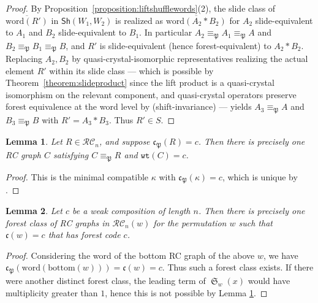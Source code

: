 \documentclass[a4paper,fleqn]{cas-sc}
\newtheorem{lemma}{Lemma}[subsection]
\theoremstyle{definition}
\theoremstyle{remark}
\numberwithin{equation}{subsection}
\DeclareMathOperator{\sch}{\mathfrak{S}}
\newcommand{\wtt}{\mathtt{wt}}
\newcommand{\RC}{\mathcal{RC}}
\newcommand{\code}{\mathfrak{c}}
\newcommand{\forest}{\mathfrak{P}}
\begin{document}
\begin{proof}
By Proposition~\ref{proposition:liftshufflewords}(2), the slide class of $\overline{\mathrm{word}(R')}$ in $\mathsf{Sh}(W_1,W_2)$ is realized as $\overline{\mathrm{word}(A_2*B_2)}$ for $A_2$ slide-equivalent to $A_1$ and $B_2$ slide-equivalent to $B_1$. In particular $A_2\equiv_\forest A_1\equiv_\forest A$ and $B_2\equiv_\forest B_1\equiv_\forest B$, and $R'$ is slide-equivalent (hence forest-equivalent) to $A_2*B_2$. Replacing $A_2,B_2$ by quasi-crystal-isomorphic representatives realizing the actual element $R'$ within its slide class --- which is possible by Theorem~\ref{theorem:slideproduct} since the lift product is a quasi-crystal isomorphism on the relevant component, and quasi-crystal operators preserve forest equivalence at the word level by \cite[Proposition~5.8]{nadeau2024forest} (shift-invariance) --- yields $A_3\equiv_\forest A$ and $B_3\equiv_\forest B$ with $R'=A_3*B_3$. Thus $R'\in S$.
\end{proof}



\begin{lemma} \label{lemma:forestlead}
Let $R\in \RC_n$, and suppose $\code_\forest(R) = c$. Then there is precisely one RC graph $C$ satisfying $C\equiv_\forest R$ and $\wtt(C) = c$.
\end{lemma}
\begin{proof}
This is the minimal compatible $\kappa$ with $\code_\forest(\kappa) = c$, which is unique by \cite[Lemma~3.12]{nadeau2024forest}.
\end{proof}

\begin{lemma} \label{lemma:forestchoice}
  Let $c$ be a weak composition of length $n$. Then there is precisely one forest class of RC graphs in $\RC_n(w)$ for the permutation $w$ such that $\code(w)=c$ that has forest code $c$.
\end{lemma}
\begin{proof}
Considering the word of the bottom RC graph of the above $w$, we have $\code_\forest(\mathrm{word}(\mathrm{bottom}(w))) = \code(w) = c$. Thus such a forest class exists. If there were another distinct forest class, the leading term of $\sch_w(x)$ would have multiplicity greater than $1$, hence this is not possible by Lemma \ref{lemma:forestlead}.
\end{proof}
\end{document}
